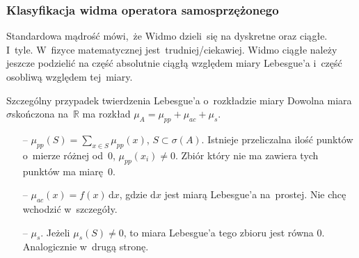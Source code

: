 \documentclass{beamer} \mode<presentation>
\newcommand{\mr}{\mathrm}
\newcommand{\mb}{\mathbb}
\newcommand{\si}{\sigma}
\newcommand{\R}{\mb{R}}
\newcommand{\sset}{\subset}
\newcommand{\Sum}{\sum\limits}
\newcommand{\de}{\mr{d}}
\begin{document}
\begin{frame}
  \frametitle{Klasyfikacja widma operatora samosprzężonego}

  \begin{block}{Standardowa mądrość mówi,~że}
    Widmo dzieli~się na dyskretne oraz ciągłe. I~tyle. W~fizyce
    matematycznej jest~trudniej/ciekawiej. Widmo ciągłe należy jeszcze
    podzielić na część absolutnie ciągłą względem miary Lebesgue'a
    i~część osobliwą względem tej~miary.
  \end{block}
  
  \begin{block}{Szczególny przypadek twierdzenia Lebesgue'a
      o~rozkładzie miary}
    Dowolna miara $\si$\dywiz skończona na~$\R$ ma rozkład
    $\mu_{ A } = \mu_{ pp } + \mu_{ ac } + \mu_{ s }$.
    \begin{itemize}
    \item[--] $\mu_{ pp }( S ) = \Sum_{ x \in S } \mu_{ pp }( x )$,
      $S \sset \si( A )$. Istnieje przeliczalna ilość punktów o~mierze
      różnej od~0, $\mu_{ pp }( x_{ i } ) \neq 0$. Zbiór który nie ma
      zawiera tych punktów ma miarę~0.
    \item[--] $\mu_{ ac }( x ) = f( x ) \, \de x$, gdzie $\de x$ jest
      miarą Lebesgue'a na~prostej. Nie chcę wchodzić w~szczegóły.
    \item[--] $\mu_{ s }$. Jeżeli $\mu_{ s }( S ) \neq 0$, to miara
      Lebesgue'a tego zbioru jest równa 0. Analogicznie w~drugą
      stronę.
    \end{itemize}
    
  \end{block}

\end{frame}
\end{document}
